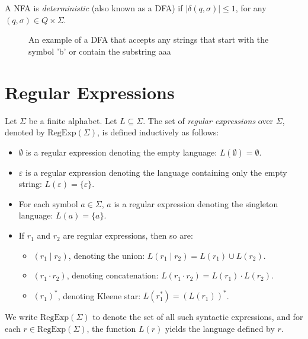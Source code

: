 A NFA is \emph{deterministic} (also known as a DFA) if $|\delta(q,\sigma)| \leq 1$, for any $(q,\sigma) \in Q \times \Sigma$.

\begin{figure}[H]
\centering
{}
\caption{An example of a DFA that accepts any strings that start with the symbol 'b' or contain the substring aaa}
\end{figure}

\section{Regular Expressions}
Let $\Sigma$ be a finite alphabet. Let $L \subseteq \Sigma$. The set of \emph{regular expressions} over $\Sigma$, denoted by $\text{RegExp}(\Sigma)$, is defined inductively as follows:

\begin{itemize}
    \item $\emptyset$ is a regular expression denoting the empty language: $L(\emptyset) = \emptyset$.
    \item $\varepsilon$ is a regular expression denoting the language containing only the empty string: $L(\varepsilon) = \{ \varepsilon \}$.
    \item For each symbol $a \in \Sigma$, $a$ is a regular expression denoting the singleton language: $L(a) = \{ a \}$.
    \item If $r_1$ and $r_2$ are regular expressions, then so are:
    \begin{itemize}
        \item $(r_1 \mid r_2)$, denoting the union: $L(r_1 \mid r_2) = L(r_1) \cup L(r_2)$.
        \item $(r_1 \cdot r_2)$, denoting concatenation: $L(r_1 \cdot r_2) = L(r_1) \cdot L(r_2)$.
        \item $(r_1)^*$, denoting Kleene star: $L(r_1^*) = (L(r_1))^*$.
    \end{itemize}
\end{itemize}
We write $\text{RegExp}(\Sigma)$ to denote the set of all such syntactic expressions, and for each $r \in \text{RegExp}(\Sigma)$, the function $L(r)$ yields the language defined by $r$.

